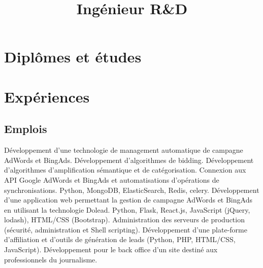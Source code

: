 \documentclass[10pt,a4paper]{moderncv}
\title{Ingénieur R\&D}
\begin{document}
    \maketitle

    \section{Diplômes et études}

    \section{Expériences}
        \subsection{Emplois}
                {Développement d'une technologie de management automatique de campagne AdWords et BingAds. \newline{}
                Développement d'algorithmes de bidding. \newline{}
                Développement d'algorithmes d'amplification sémantique et de catégorisation.\newline{}
                Connexion aux API Google AdWords et BingAds et automatisations d'opérations de synchronisations.\newline{}
                Python, MongoDB, ElasticSearch, Redis, celery.\newline{}\newline{}
                Développement d'une application web permettant la gestion de campagne AdWords et BingAds en utilisant la technologie Dolead.\newline{}
                Python, Flask, React.js, JavaScript (jQuery, lodash), HTML/CSS (Bootstrap).\newline{}}
                {Administration des serveurs de production (sécurité, administration et Shell scripting).\newline{}
                Développement d'une plate-forme d'affiliation et d'outils de génération de leads (Python, PHP, HTML/CSS, JavaScript). \newline{}}
                {Développement pour le back office d'un site destiné aux professionnels du journalisme.}
\end{document}
